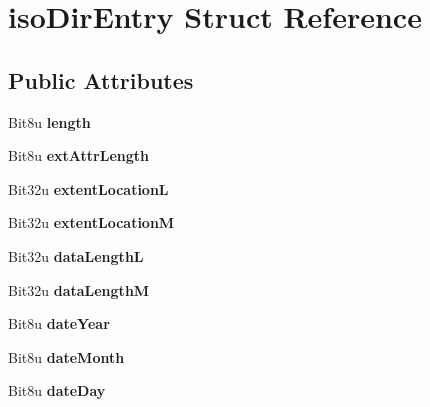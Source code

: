 \hypertarget{structisoDirEntry}{\section{iso\-Dir\-Entry Struct Reference}
\label{structisoDirEntry}
}
\subsection*{Public Attributes}
\begin{DoxyCompactItemize}
\item 
\hypertarget{structisoDirEntry_a606ed0c5cde9bf62c77d12e781efc957}{Bit8u {\bfseries length}}\label{structisoDirEntry_a606ed0c5cde9bf62c77d12e781efc957}

\item 
\hypertarget{structisoDirEntry_a3e7041fc692049235f55218b34183716}{Bit8u {\bfseries ext\-Attr\-Length}}\label{structisoDirEntry_a3e7041fc692049235f55218b34183716}

\item 
\hypertarget{structisoDirEntry_a96bae5ab3ff4270c3cc7523b7c6a6938}{Bit32u {\bfseries extent\-Location\-L}}\label{structisoDirEntry_a96bae5ab3ff4270c3cc7523b7c6a6938}

\item 
\hypertarget{structisoDirEntry_ac26c9599db918d0ae821eccb126791d0}{Bit32u {\bfseries extent\-Location\-M}}\label{structisoDirEntry_ac26c9599db918d0ae821eccb126791d0}

\item 
\hypertarget{structisoDirEntry_aedcd90ff64e83cb9ecba053b297036ef}{Bit32u {\bfseries data\-Length\-L}}\label{structisoDirEntry_aedcd90ff64e83cb9ecba053b297036ef}

\item 
\hypertarget{structisoDirEntry_a2708090ee2e8a5b9e353bb34d7ab0139}{Bit32u {\bfseries data\-Length\-M}}\label{structisoDirEntry_a2708090ee2e8a5b9e353bb34d7ab0139}

\item 
\hypertarget{structisoDirEntry_a317758d7ba2e6c75ad0f241a1b191f6d}{Bit8u {\bfseries date\-Year}}\label{structisoDirEntry_a317758d7ba2e6c75ad0f241a1b191f6d}

\item 
\hypertarget{structisoDirEntry_a2d9adb6b5e23ca7b33f3f0120f3e3ce0}{Bit8u {\bfseries date\-Month}}\label{structisoDirEntry_a2d9adb6b5e23ca7b33f3f0120f3e3ce0}

\item 
\hypertarget{structisoDirEntry_a354aef5ab8e20a6eeffec9cdc8460fa8}{Bit8u {\bfseries date\-Day}}\label{structisoDirEntry_a354aef5ab8e20a6eeffec9cdc8460fa8}


\end{DoxyCompactItemize}

